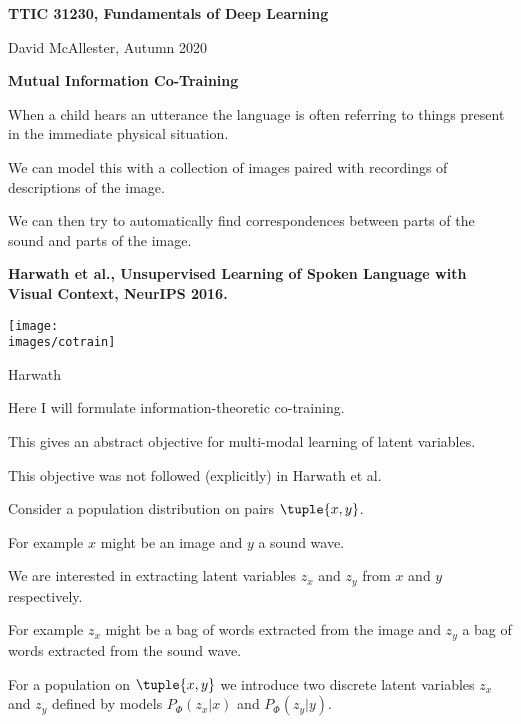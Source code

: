 





{\Huge
  \centerline{\bf TTIC 31230,  Fundamentals of Deep Learning}
  \vfill
  \centerline{David McAllester, Autumn   2020}
  \vfill
  \centerline{\bf Mutual Information Co-Training}
  \vfill
  \vfill



When a child hears an utterance the language is often referring to things present in the immediate physical situation.

\vfill
We can model this with a collection of images paired with recordings of descriptions of the image.

\vfill
We can then try to automatically find correspondences between parts of the sound and parts of the image.

\vfill
{\bf Harwath et al., Unsupervised Learning of Spoken Language with Visual Context, NeurIPS 2016.}


\centerline{\texttt{[image: \\images/cotrain]}}

\centerline{Harwath}



Here I will formulate information-theoretic co-training.

\vfill
This gives an abstract objective for multi-modal learning of latent variables.

\vfill
This objective was not followed (explicitly) in Harwath et al.


Consider a population distribution on pairs $\tuple{x,y}$.

\vfill
For example $x$ might be an image and $y$ a sound wave.

\vfill
We are interested in extracting latent variables $z_x$ and $z_y$ from $x$ and $y$ respectively.

\vfill
For example $z_x$ might be a bag of words extracted from the image and $z_y$ a bag of words extracted from the sound wave.



For a population on $\tuple{x,y}$ we introduce two discrete latent variables $z_x$ and $z_y$ defined by
models {\color{red} $P_\Phi(z_x|x)$} and {\color{red} $P_\Phi(z_y|y)$}.

}
